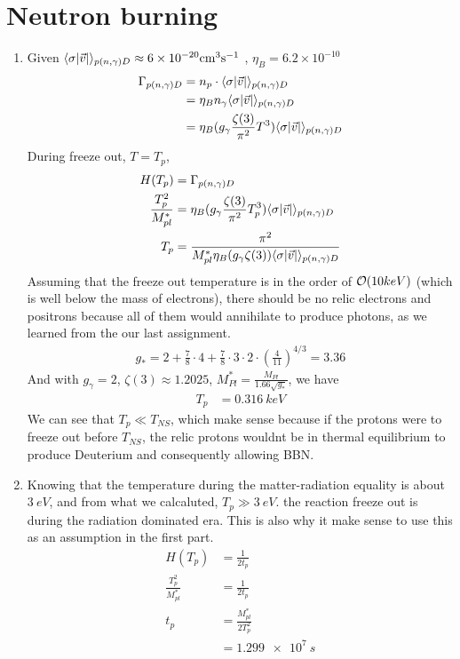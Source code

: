 \section{Neutron burning}
\begin{enumerate}[label=\alph*)]
\item Given $\langle\sigma \abs{\vec{v}} \rangle_{p(n,\gamma)D} \approx 6\times\SI{}{10^{-20} cm^3 s^{-1}}$ , $\eta_B = 6.2 \times 10^{-10}$
\begin{align}
\Gamma_{p(n,\gamma)D} &= n_p \cdot \langle\sigma \abs{\vec{v}} \rangle_{p(n,\gamma)D} \\
	&= \eta_B n_\gamma  \langle\sigma \abs{\vec{v}} \rangle_{p(n,\gamma)D} \nonumber \\ 
	&= \eta_B (g_\gamma \frac{\zeta(3)}{\pi^2}T^3)\langle\sigma \abs{\vec{v}} \rangle_{p(n,\gamma)D} \nonumber
\end{align}
During freeze out, $T = T_p$,
\begin{align}
H(T_p) &= \Gamma_{p(n,\gamma)D}  \\
\frac{T_p^2}{M^{\ast}_{pl}}  &= \eta_B (g_\gamma \frac{\zeta(3)}{\pi^2}T_p^3)\langle\sigma \abs{\vec{v}} \rangle_{p(n,\gamma)D} \nonumber \\
T_p &= \frac{\pi^2}{M^{\ast}_{pl} \eta_B (g_\gamma \zeta(3))\langle\sigma \abs{\vec{v}} \rangle_{p(n,\gamma)D}}
\end{align}
Assuming that the freeze out temperature is in the order of $\order{10keV}$ (which is well below the mass of electrons), there should be no relic electrons and positrons because all of them would annihilate to produce photons, as we learned from the our last assignment.
\begin{align}
g_* = 2 + \frac{7}{8} \cdot 4 +\frac{7}{8} \cdot 3 \cdot 2 \cdot \left( \frac{4}{11} \right)^{4/3} = 3.36
\end{align}
And with $g_\gamma = 2$, $\zeta(3) \approx 1.2025$, $M^{\ast}_{Pl} =\frac{M_{Pl}}{1.66\sqrt{g_*}}$, we have
\begin{align}
T_p &= \SI{0.316}{keV}
\end{align}
We can see that $T_p \ll T_{NS}$, which make sense because if the protons were to freeze out before $T_{NS}$, the relic protons wouldnt be in thermal equilibrium to produce Deuterium and consequently allowing BBN.

\item Knowing that the temperature during the matter-radiation equality is about $\SI{3}{eV}$, and from what we calcaluted, $T_p \gg \SI{3}{eV}$. the reaction freeze out is during the radiation dominated era. This is also why it make sense to use this as an assumption in the first part. 
\begin{align}
H(T_p) 	&= \frac{1}{2t_p} \\
\frac{T_p^2}{M^{\ast}_{pl}} &= \frac{1}{2t_p} \nonumber  \\
t_p &= \frac{M^{\ast}_{pl}} {2T_p^2}  \nonumber  \\
	&= \SI{1.299e7}{s}\nonumber  
\end{align}
\end{enumerate}

